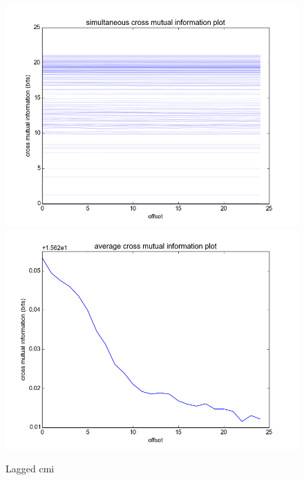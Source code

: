 \documentclass[12pt]{article}
\begin{document}
\begin{figure}\label{fig:lag_cmi}
  \begin{center}
    \includegraphics[scale=0.4]{cmi_mc}
    \includegraphics[scale=0.4]{cmi_summary}
  \end{center}
  \caption{Lagged cmi}
\end{figure}
\end{document}
